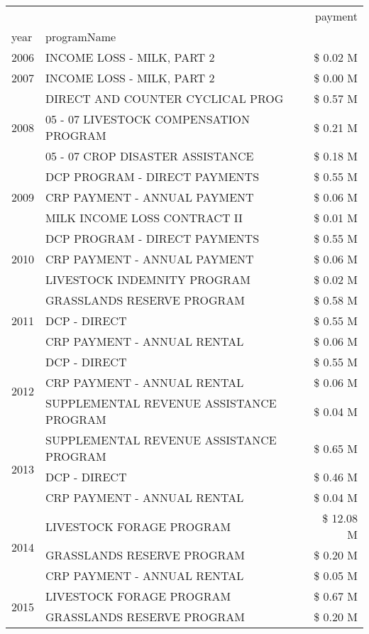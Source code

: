 \begin{tabular}{llr}
\toprule
 &  & payment \\
year & programName &  \\
\midrule
2006 & INCOME LOSS - MILK, PART 2 & \$ 0.02 M \\
\cline{1-3}
2007 & INCOME LOSS - MILK, PART 2 & \$ 0.00 M \\
\cline{1-3}
\multirow[t]{3}{*}{2008} & DIRECT AND COUNTER CYCLICAL PROG & \$ 0.57 M \\
 & 05 - 07 LIVESTOCK COMPENSATION PROGRAM & \$ 0.21 M \\
 & 05 - 07 CROP DISASTER ASSISTANCE & \$ 0.18 M \\
\cline{1-3}
\multirow[t]{3}{*}{2009} & DCP PROGRAM - DIRECT PAYMENTS & \$ 0.55 M \\
 & CRP PAYMENT - ANNUAL PAYMENT & \$ 0.06 M \\
 & MILK INCOME LOSS CONTRACT II & \$ 0.01 M \\
\cline{1-3}
\multirow[t]{3}{*}{2010} & DCP PROGRAM - DIRECT PAYMENTS & \$ 0.55 M \\
 & CRP PAYMENT - ANNUAL PAYMENT & \$ 0.06 M \\
 & LIVESTOCK INDEMNITY PROGRAM & \$ 0.02 M \\
\cline{1-3}
\multirow[t]{3}{*}{2011} & GRASSLANDS RESERVE PROGRAM & \$ 0.58 M \\
 & DCP - DIRECT & \$ 0.55 M \\
 & CRP PAYMENT - ANNUAL RENTAL & \$ 0.06 M \\
\cline{1-3}
\multirow[t]{3}{*}{2012} & DCP - DIRECT & \$ 0.55 M \\
 & CRP PAYMENT - ANNUAL RENTAL & \$ 0.06 M \\
 & SUPPLEMENTAL REVENUE ASSISTANCE PROGRAM & \$ 0.04 M \\
\cline{1-3}
\multirow[t]{3}{*}{2013} & SUPPLEMENTAL REVENUE ASSISTANCE PROGRAM & \$ 0.65 M \\
 & DCP - DIRECT & \$ 0.46 M \\
 & CRP PAYMENT - ANNUAL RENTAL & \$ 0.04 M \\
\cline{1-3}
\multirow[t]{3}{*}{2014} & LIVESTOCK FORAGE PROGRAM & \$ 12.08 M \\
 & GRASSLANDS RESERVE PROGRAM & \$ 0.20 M \\
 & CRP PAYMENT - ANNUAL RENTAL & \$ 0.05 M \\
\cline{1-3}
\multirow[t]{3}{*}{2015} & LIVESTOCK FORAGE PROGRAM & \$ 0.67 M \\
 & GRASSLANDS RESERVE PROGRAM & \$ 0.20 M \\

\end{tabular}
